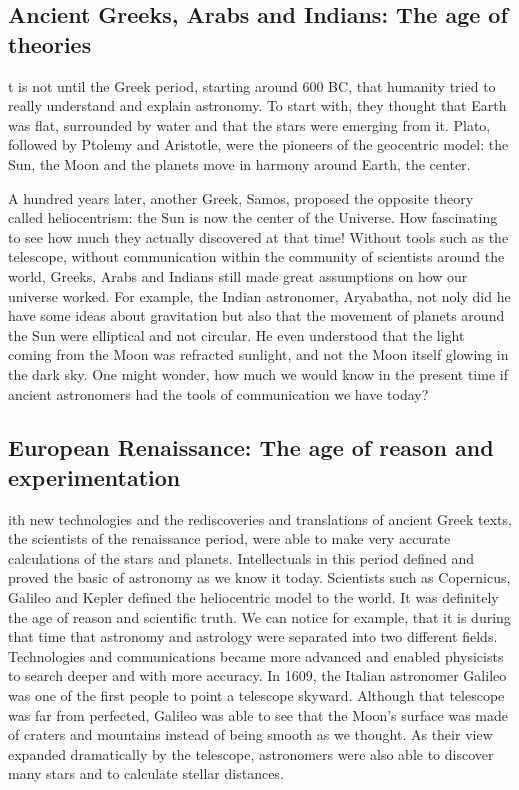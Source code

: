 \subsection{Ancient Greeks, Arabs and Indians: The age of theories}
t is not until the Greek period, starting around 600 BC, that humanity tried to really understand and explain astronomy. 
To start with, they thought that Earth was flat, surrounded by water and that the stars were emerging from it.
Plato, followed by Ptolemy and Aristotle, were the pioneers of the geocentric model: the Sun, the Moon and the planets move in harmony around Earth, the center.

A hundred years later, another Greek, Samos, proposed the opposite theory called heliocentrism: the Sun is now the center of the Universe.
How fascinating to see how much they actually discovered at that time!  
Without tools such as the telescope, without communication within the community of scientists around the world, Greeks, Arabs and Indians still made great assumptions on how our universe worked. 
For example, the Indian astronomer, Aryabatha, not noly did he have some ideas about gravitation but also that the movement of planets around the Sun were elliptical and not circular.
He even understood that the light coming from the Moon was refracted sunlight, and not the Moon itself glowing in the dark sky.
One might wonder, how much we would know in the present time if ancient astronomers had the tools of communication we have today?
\cite{GreekAstro}
\cite{Aryabhata}

\subsection{European Renaissance: The age of reason and experimentation}
ith new technologies and the rediscoveries and translations of ancient Greek texts, the scientists of the renaissance period, were able to make very accurate calculations of the stars and planets.
Intellectuals in this period defined and proved the basic of astronomy as we know it today.  
Scientists such as Copernicus, Galileo and Kepler defined the heliocentric model to the world. 
It was definitely the age of reason and scientific truth. 
We can notice for example, that it is during that time that astronomy and astrology were separated into two different fields. 
Technologies and communications became more advanced and enabled physicists to search deeper and with more accuracy. 
In 1609, the Italian astronomer Galileo was one of the first people to point a telescope skyward. 
Although that telescope was far from perfected, Galileo was able to see that the Moon's surface was made of craters and mountains instead of being smooth as we thought.
As their view expanded dramatically by the telescope, astronomers were also able to discover many stars and to calculate stellar distances.
\cite{GalileoTelescope}

